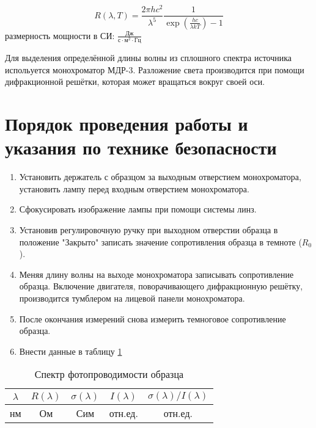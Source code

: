 \begin{equation}
R(\lambda, T) = \frac{2 \pi h c^2}{\lambda^5} \frac{1}{\exp \left( \frac{h c}{\lambda k T} \right) - 1}
\label{eq7_intencity}
\end{equation}
размерность мощности в СИ: $\frac{\text{Дж}}{\text{с} \cdot \text{м}^2 \cdot \text{Гц}}$

Для выделения определённой длины волны из сплошного спектра источника испольуется монохроматор МДР-3. Разложение света производится при помощи дифракционной решётки, которая может вращаться вокруг своей оси.

\section{Порядок проведения работы и указания по технике безопасности}

\begin{enumerate}
\item Установить держатель с образцом за выходным отверстием монохроматора, установить лампу перед входным отверстием монохроматора.
\item Сфокусировать изображение лампы при помощи системы линз.
\item Установив регулировочную ручку при выходном отверстии образца в положение "Закрыто" записать значение сопротивления образца в темноте ($R_{0}$).
\item Меняя длину волны на выходе монохроматора записывать сопротивление образца. Включение двигателя, поворачивающего дифракционную решётку, производится тумблером на лицевой панели монохроматора.
\item После окончания измерений снова измерить темноговое сопротивление образца.
\item Внести данные в таблицу \ref{table7_data}
\end{enumerate}

\begin{table}[h!]
\caption{Спектр фотопроводимости образца}
\begin{center}
\begin{tabular}{c|c|c|c|c}
$\lambda$ & $R(\lambda)$ & $\sigma(\lambda)$ & $I(\lambda)$ & $\sigma(\lambda) / I(\lambda)$ \\
\hline
нм & Ом & Сим & отн.ед. & отн.ед. \\
\hline
\end{tabular}
\end{center}
\label{table7_data}
\end{table}

